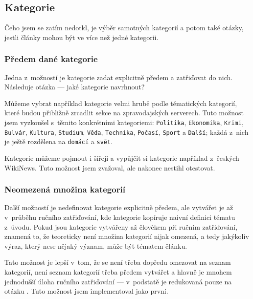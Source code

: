 \documentclass[12pt,a4paper]{report}
\begin{document}
\subsection{Kategorie}
\label{sec:jakekategorie}
Čeho jsem se zatím nedotkl, je výběr samotných kategorií a potom také otázky, jestli články mohou být ve více než jedné kategorii. %

\subsubsection{Předem dané kategorie}
\label{sec:omezene_teorie}

Jedna z~možností je kategorie zadat explicitně předem a zatřiďovat do nich. Následuje otázka --- jaké kategorie navrhnout?

Můžeme vybrat například kategorie velmi hrubě podle tématických kategorií, které budou přibližně zrcadlit sekce na zpravodajských serverech. Tuto možnost jsem vyzkoušel s~těmito konkrétními kategoriemi: \texttt{Politika}, \texttt{Ekonomika}, \texttt{Krimi}, \texttt{Bulvár}, \texttt{Kultura}, \texttt{Studium}, \texttt{Věda}, \texttt{Technika}, \texttt{Počasí}, \texttt{Sport} a \texttt{Další}; každá z~nich je ještě rozdělena na \texttt{domácí} a \texttt{svět}. 

Kategorie můžeme pojmout i šířeji a vypůjčit si kategorie například z~českých WikiNews. Tuto možnost jsem zvažoval, ale nakonec nestihl otestovat.


\subsubsection{Neomezená množina kategorií}
\label{sec:neomezene_teorie}

Další možností je nedefinovat kategorie explicitně předem, ale vytvářet je až v~průběhu ručního zatřiďování, kde  kategorie kopíruje naivní definici tématu z~úvodu. Pokud jsou kategorie vytvářeny až člověkem při ručním zatřiďování, znamená to, že teoreticky není množina kategorií nijak omezená, a tedy jakýkoliv výraz, který nese nějaký význam, může být tématem článku.

Tato možnost je lepší v~tom, že se není třeba dopředu omezovat na seznam kategorií, není seznam kategorií třeba předem vytvářet a hlavně je mnohem jednodušší úloha ručního zatřiďování --- v~podstatě je redukovaná pouze na otázku . Tuto možnost jsem implementoval jako první.
\end{document}
